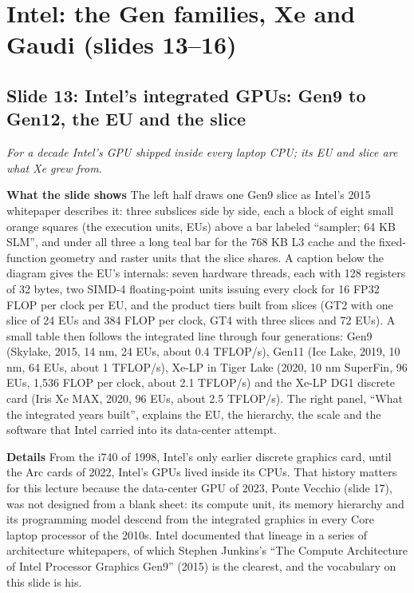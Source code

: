 \documentclass[11pt,letterpaper]{article}
\newcommand{\setstage}[1]{\colorlet{stagec}{#1}}
\newcommand{\slide}[3]{%
  \subsection[Slide #1: #2]{Slide #1: #2}%
  {\color{muted}\itshape #3\par}\medskip}
\newcommand{\para}[1]{\medskip\noindent\textbf{#1}\quad}
\begin{document}
\setstage{attn}
\section{Intel: the Gen families, Xe and Gaudi (slides 13--16)}

\slide{13}{Intel's integrated GPUs: Gen9 to Gen12, the EU and the slice}{For a decade Intel's GPU shipped inside every laptop CPU; its EU and slice are what Xe grew from.}

\para{What the slide shows} The left half draws one Gen9 slice as Intel's 2015 whitepaper describes it: three subslices side by side, each a block of eight small orange squares (the execution units, EUs) above a bar labeled ``sampler; 64 KB SLM'', and under all three a long teal bar for the 768 KB L3 cache and the fixed-function geometry and raster units that the slice shares. A caption below the diagram gives the EU's internals: seven hardware threads, each with 128 registers of 32 bytes, two SIMD-4 floating-point units issuing every clock for 16 FP32 FLOP per clock per EU, and the product tiers built from slices (GT2 with one slice of 24 EUs and 384 FLOP per clock, GT4 with three slices and 72 EUs). A small table then follows the integrated line through four generations: Gen9 (Skylake, 2015, 14 nm, 24 EUs, about 0.4 TFLOP/s), Gen11 (Ice Lake, 2019, 10 nm, 64 EUs, about 1 TFLOP/s), Xe-LP in Tiger Lake (2020, 10 nm SuperFin, 96 EUs, 1{,}536 FLOP per clock, about 2.1 TFLOP/s) and the Xe-LP DG1 discrete card (Iris Xe MAX, 2020, 96 EUs, about 2.5 TFLOP/s). The right panel, ``What the integrated years built'', explains the EU, the hierarchy, the scale and the software that Intel carried into its data-center attempt.

\para{Details} From the i740 of 1998, Intel's only earlier discrete graphics card, until the Arc cards of 2022, Intel's GPUs lived inside its CPUs. That history matters for this lecture because the data-center GPU of 2023, Ponte Vecchio (slide 17), was not designed from a blank sheet: its compute unit, its memory hierarchy and its programming model descend from the integrated graphics in every Core laptop processor of the 2010s. Intel documented that lineage in a series of architecture whitepapers, of which Stephen Junkins's ``The Compute Architecture of Intel Processor Graphics Gen9'' (2015) is the clearest, and the vocabulary on this slide is his.
\end{document}
